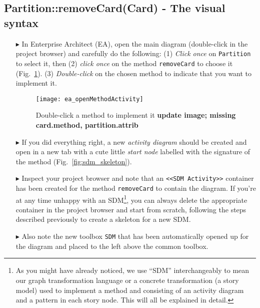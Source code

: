 \newpage
\subsection{Partition::removeCard(Card) - The visual syntax}
\visHeader
\hypertarget{remCard vis}{}

\begin{itemize}

\item[$\blacktriangleright$] In Enterprise Architect (EA), open the main diagram (double-click in the project browser) and carefully do the following: (1) \emph{Click once} on
\texttt{Partition} to select it, then (2) \emph{click once} on the method \texttt{removeCard} to choose it (Fig.~\ref{fig:sdm_start}). (3) \emph{Double-click}
on the chosen method to indicate that you want to implement it.

\begin{figure}[htp]
\begin{center}
  \texttt{[image: ea\_openMethodActivity]}
  \caption{Double-click a method to implement it {\bf update image; missing card.method, partition.attrib} }  
  \label{fig:sdm_start}
\end{center}
\end{figure}
 
\item[$\blacktriangleright$] If you did everything right, a new \emph{activity diagram} should be created and open in a new tab with a cute little \emph{start node} 
labelled with the signature of the method (Fig.~\ref{fig:sdm_skeleton}).  

\item[$\blacktriangleright$] Inspect your project browser and note that an \texttt{<<SDM Activity>>} container has been created for the method
\texttt{removeCard} to contain the diagram. If you're at any time unhappy with an SDM\footnote{As you might have already noticed, we use ``SDM'' interchangeably
to mean our graph transformation language or a concrete transformation (a story model) used to implement a method and consisting of an activity diagram and a
pattern in each story node. This will all be explained in detail.}, you can always delete the appropriate container in the project browser and start from
scratch, following the steps described previously to create a skeleton for a new SDM. 

\item[$\blacktriangleright$] Also note the new toolbox \texttt{SDM} that has been automatically opened up for the diagram and placed to the left above the 
common toolbox.


\end{itemize}
